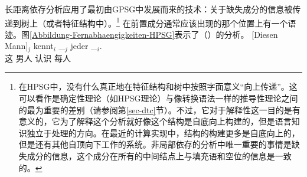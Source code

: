 长距离依存分析应用了最初由GPSG中发展而来的技术：关于缺失成分的信息被传递到树上（或者特征结构中）。\footnote{%
在HPSG中，没有什么真正地在特征结构和树中按照字面意义“向上传递”。这可以看作是确定性理论（如HPSG理论）与像转换语法一样的推导性理论之间的最为重要的差别（请参阅第\ref{sec-dtc}节）。不过，它对于解释性这一目的是有意义的，它为了解释这个分析就好像这个结构是自底向上构建的，但是语言知识独立于处理的方向。在最近的计算实现中，结构的构建更多是自底向上的，但是还有其他自顶向下工作的系统。非局部依存的分析中唯一重要的事情是缺失成分的信息，这个成分在所有的中间结点上与填充语和空位的信息是一致的。
}
在前置成分通常应该出现的那个位置上有一个语迹。图\ref{Abbildung-Fernabhaengigkeiten-HPSG}表示了（）的分析。
\ea
\label{Beispiel-Diesen-Mann-kent-jeder-HPSG}
\gll {}[Diesen Mann]$_j$ kennt$_i$ \_$_j$ jeder \_$_i$.\\
	 {}\spacebr{}这 男人 认识 {} 每人\\
\z
